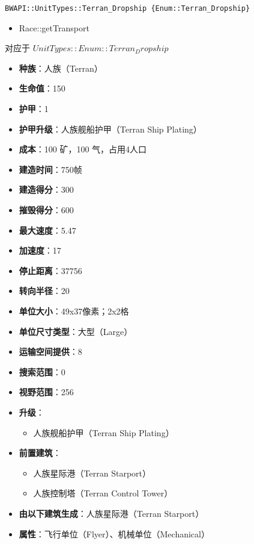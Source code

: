 \begin{tcolorbox}[colback=white, colframe=black!60!white, title=Terran\_Dropship(), arc=0mm]
    \begin{verbatim}
BWAPI::UnitTypes::Terran_Dropship {Enum::Terran_Dropship}
    \end{verbatim}
    \begin{refer}
        \begin{itemize}
            \item Race::getTransport
        \end{itemize}
    \end{refer}
    对应于  $ UnitTypes::Enum::Terran_Dropship $ 
    
    \begin{itemize}
        \item \textbf{种族}：人族（Terran）
        \item \textbf{生命值}：150
        \item \textbf{护甲}：1
        \item \textbf{护甲升级}：人族舰船护甲（Terran Ship Plating）
        \item \textbf{成本}：100 矿，100 气，占用4人口
        \item \textbf{建造时间}：750帧
        \item \textbf{建造得分}：300
        \item \textbf{摧毁得分}：600
        \item \textbf{最大速度}：5.47
        \item \textbf{加速度}：17
        \item \textbf{停止距离}：37756
        \item \textbf{转向半径}：20
        \item \textbf{单位大小}：49x37像素；2x2格
        \item \textbf{单位尺寸类型}：大型（Large）
        \item \textbf{运输空间提供}：8
        \item \textbf{搜索范围}：0
        \item \textbf{视野范围}：256
        \item \textbf{升级}：
            \begin{itemize}
                \item 人族舰船护甲（Terran Ship Plating）
            \end{itemize}
        \item \textbf{前置建筑}：
            \begin{itemize}
                \item 人族星际港（Terran Starport）
                \item 人族控制塔（Terran Control Tower）
            \end{itemize}
        \item \textbf{由以下建筑生成}：人族星际港（Terran Starport）
        \item \textbf{属性}：飞行单位（Flyer）、机械单位（Mechanical）
    \end{itemize}
\end{tcolorbox}

